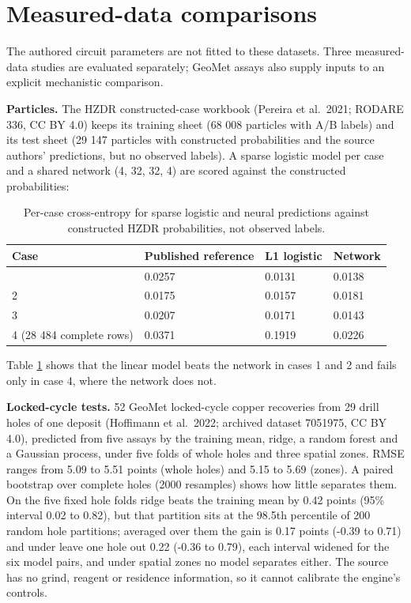 \documentclass[10pt]{article}
\begin{document}
\section{Measured-data comparisons}\label{measured-data-comparisons}

The authored circuit parameters are not fitted to these datasets. Three
measured-data studies are evaluated separately; GeoMet assays also
supply inputs to an explicit mechanistic comparison.

\textbf{Particles.} The HZDR constructed-case workbook (Pereira et
al.~2021; RODARE 336, CC BY 4.0) keeps its training sheet (68 008
particles with A/B labels) and its test sheet (29 147 particles with
constructed probabilities and the source authors' predictions, but no
observed labels). A sparse logistic model per case and a shared network
(4, 32, 32, 4) are scored against the constructed probabilities:

{\def\LTcaptype{none} %
\begin{longtable}[]{@{}llll@{}}
\caption{Per-case cross-entropy for sparse logistic and neural predictions against constructed HZDR probabilities, not observed labels.}\label{tab:particle-probabilities}\\
\toprule\noalign{}
Case & Published reference & L1 logistic & Network \\
\midrule\noalign{}
\endhead
\bottomrule\noalign{}
\endlastfoot
1 & 0.0257 & 0.0131 & 0.0138 \\
2 & 0.0175 & 0.0157 & 0.0181 \\
3 & 0.0207 & 0.0171 & 0.0143 \\
4 (28 484 complete rows) & 0.0371 & 0.1919 & 0.0226 \\
\end{longtable}
}

Table \ref{tab:particle-probabilities} shows that the linear model beats the network in cases 1 and 2 and fails only in
case 4, where the network does not.

\textbf{Locked-cycle tests.} 52 GeoMet locked-cycle copper recoveries
from 29 drill holes of one deposit (Hoffimann et al.~2022; archived
dataset 7051975, CC BY 4.0), predicted from five assays by the training
mean, ridge, a random forest and a Gaussian process, under five folds of
whole holes and three spatial zones. RMSE ranges from 5.09 to 5.51
points (whole holes) and 5.15 to 5.69 (zones). A paired bootstrap over
complete holes (2000 resamples) shows how little separates them. On the
five fixed hole folds ridge beats the training mean by 0.42 points (95\%
interval 0.02 to 0.82), but that partition sits at the 98.5th percentile
of 200 random hole partitions; averaged over them the gain is 0.17
points (-0.39 to 0.71) and under leave one hole out 0.22 (-0.36 to
0.79), each interval widened for the six model pairs, and under spatial
zones no model separates either. The source has no grind, reagent or
residence information, so it cannot calibrate the engine's controls.
\end{document}
